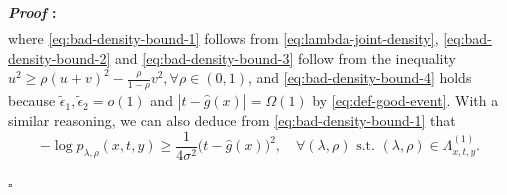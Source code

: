 \documentclass{article}
\def\eps{{\epsilon}}
\renewenvironment{proof}{\noindent\textbf{\textit{Proof }:}}{\hfill$\square$}
\begin{document}
\begin{proof}
\begin{subequations}
\begin{align}
        \end{align}
    \end{subequations}
    where \eqref{eq:bad-density-bound-1} follows from \eqref{eq:lambda-joint-density}, \eqref{eq:bad-density-bound-2} and \eqref{eq:bad-density-bound-3} follow from the inequality $u^2 \geq \rho (u+v)^2 - \frac{\rho}{1-\rho}v^2, \forall \rho\in(0,1)$, and \eqref{eq:bad-density-bound-4} holds because $\tilde{\eps}_1,\tilde{\eps}_2 = o(1)$ and $|t-\hat{g}(x)|=\Omega(1)$ by \eqref{eq:def-good-event}. With a similar reasoning, we can also deduce from \eqref{eq:bad-density-bound-1} that
    \begin{equation}
        \label{eq:bad-density-bound-single}
        -\log p_{\lambda,\rho}(x,t,y) \geq \frac{1}{4\sigma^2}\big(t-\hat{g}(x)\big)^2, \quad \forall(\lambda,\rho)\text{ s.t. } (\lambda,\rho)\in\Lambda_{x,t,y}^{(1)}.
    \end{equation}


\end{proof}
\end{document}
